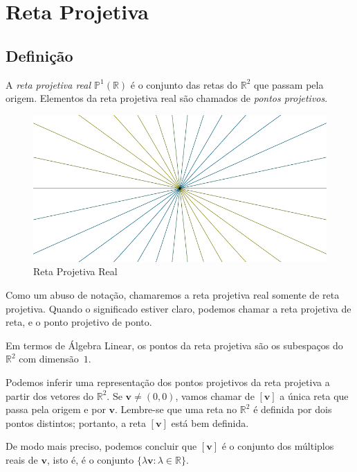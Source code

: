\chapter{Reta Projetiva} \label{chap:retaprojetiva}

\section{Definição} \label{sec:defnretaprojetiva}

\begin{defn} \label{defn:retaprojetivareal}
A \emph{reta projetiva real \(\mathbb{P}^1(\mathbb{R})\)} é o conjunto das retas do \(\mathbb{R}^2\) que passam pela origem.
Elementos da reta projetiva real são chamados de \emph{pontos projetivos}.
\end{defn}

\begin{figure}[hbtp]
  \centering
  \includegraphics{figures/retaprojetiva.pdf}
  \caption{Reta Projetiva Real}
\end{figure}

Como um abuso de notação, chamaremos a reta projetiva real somente de reta projetiva.
Quando o significado estiver claro, podemos chamar a reta projetiva de reta, e o ponto projetivo de ponto.

Em termos de Álgebra Linear, os pontos da reta projetiva são os subespaços do $\mathbb{R}^2$ com dimensão~$1$.

Podemos inferir uma representação dos pontos projetivos da reta projetiva a partir dos vetores do \(\mathbb{R}^2\).
Se \(\mathbf{v} \neq (0, 0)\), vamos chamar de \([\mathbf{v}]\) a única reta que passa pela origem e por \(\mathbf{v}\).
Lembre-se que uma reta no \(\mathbb{R}^2\) é definida por dois pontos distintos; portanto, a reta \([\mathbf{v}]\) está bem definida.

De modo mais preciso, podemos concluir que \([\mathbf{v}]\) é o conjunto dos múltiplos reais de \(\mathbf{v}\), isto é, é o conjunto \(\{ \lambda \mathbf{v} : \lambda \in \mathbb{R}\}\).

